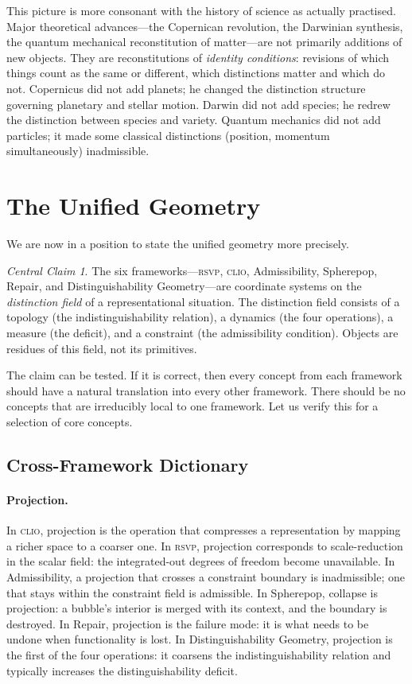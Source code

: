 \documentclass[12pt, letterpaper]{article}
\theoremstyle{remark}
\newtheorem*{claim}{Central Claim}
\newcommand{\rsvp}{\textsc{rsvp}}
\newcommand{\clio}{\textsc{clio}}
\begin{document}
This picture is more consonant with the history of science as actually
practised.  Major theoretical advances---the Copernican revolution, the
Darwinian synthesis, the quantum mechanical reconstitution of matter---are
not primarily additions of new objects.  They are reconstitutions of
\emph{identity conditions}: revisions of which things count as the same
or different, which distinctions matter and which do not.  Copernicus did
not add planets; he changed the distinction structure governing planetary
and stellar motion.  Darwin did not add species; he redrew the distinction
between species and variety.  Quantum mechanics did not add particles; it
made some classical distinctions (position, momentum simultaneously) inadmissible.

\section{The Unified Geometry}

We are now in a position to state the unified geometry more precisely.

\begin{claim}
The six frameworks---\rsvp{}, \clio{}, Admissibility, Spherepop, Repair,
and Distinguishability Geometry---are coordinate systems on the
\emph{distinction field} of a representational situation.  The distinction
field consists of a topology (the indistinguishability relation), a dynamics
(the four operations), a measure (the deficit), and a constraint (the
admissibility condition).  Objects are residues of this field, not its
primitives.
\end{claim}

The claim can be tested.  If it is correct, then every concept from each
framework should have a natural translation into every other framework.
There should be no concepts that are irreducibly local to one framework.
Let us verify this for a selection of core concepts.

\subsection{Cross-Framework Dictionary}

\paragraph{Projection.}
In \clio{}, projection is the operation that compresses a representation
by mapping a richer space to a coarser one.
In \rsvp{}, projection corresponds to scale-reduction in the scalar field:
the integrated-out degrees of freedom become unavailable.
In Admissibility, a projection that crosses a constraint boundary is
inadmissible; one that stays within the constraint field is admissible.
In Spherepop, collapse is projection: a bubble's interior is merged with
its context, and the boundary is destroyed.
In Repair, projection is the failure mode: it is what needs to be undone
when functionality is lost.
In Distinguishability Geometry, projection is the first of the four
operations: it coarsens the indistinguishability relation and typically
increases the distinguishability deficit.
\end{document}
